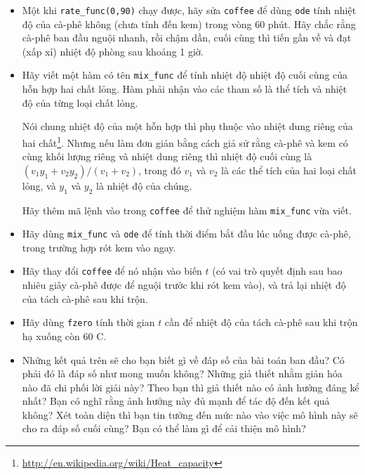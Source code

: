 \documentclass[12pt]{book}
\begin{document}
\begin{ex}
\begin{itemize}
\item Một khi \verb#rate_func(0,90)# chạy được, hãy sửa
{\tt coffee} để dùng {\tt ode} tính nhiệt độ của cà-phê không (chưa tính
đến kem) trong vòng 60 phút. Hãy chắc rằng cà-phê ban đầu
nguội nhanh, rồi chậm dần, cuối cùng thì tiến gần về và đạt (xấp xỉ)
nhiệt độ phòng sau khoảng 1 giờ.

\item Hãy viết một hàm có tên \verb#mix_func# để tính nhiệt độ 
nhiệt độ cuối cùng của hỗn hợp hai chất lỏng. Hàm phải nhận vào
các tham số là thể tích và nhiệt độ của từng loại chất lỏng.

Nói chung nhiệt độ của một hỗn hợp thì phụ thuộc vào nhiệt dung
riêng của hai chất\footnote{\url{http://en.wikipedia.org/wiki/Heat_capacity}}.
Nhưng nếu làm đơn giản bằng cách giả sử rằng cà-phê và kem có
cùng khối lượng riêng và nhiệt dung riêng thì nhiệt độ cuối cùng là
$(v_1 y_1 + v_2 y_2) / (v_1 + v_2)$, trong đó $v_1$ và $v_2$ là
các thể tích của hai loại chất lỏng, và $y_1$ và $y_2$ là nhiệt độ của chúng.

Hãy thêm mã lệnh vào trong {\tt coffee} để thử nghiệm hàm 
\verb#mix_func# vừa viết.

\item Hãy dùng \verb#mix_func# và {\tt ode} để tính thời điểm
bắt đầu lúc uống được cà-phê, trong trường hợp rót kem vào ngay.

\item Hãy thay đổi {\tt coffee} để nó nhận vào biến $t$ (có vai trò
quyết định sau bao nhiêu giây cà-phê được để nguội trước khi rót kem
vào), và trả lại nhiệt độ của tách cà-phê sau khi trộn.

\item Hãy dùng {\tt fzero} tính thời gian $t$ cần để nhiệt độ của
tách cà-phê sau khi trộn hạ xuống còn 60 \degree C.

\item Những kết quả trên sẽ cho bạn biết gì về đáp số của bài toán
ban đầu? Có phải đó là đáp số như mong muốn không? Những
giả thiết nhằm giản hóa nào đã chi phối lời giải này? Theo bạn thì
giả thiết nào có ảnh hưởng đáng kể nhất? Bạn có nghĩ rằng ảnh
hưởng này đủ mạnh để tác độ đến kết quả không? Xét toàn diện
thì bạn tin tưởng đến mức nào vào việc mô hình này sẽ cho ra 
đáp số cuối cùng? Bạn có thể làm gì để cải thiện mô hình?

\end{itemize}

\end{ex}
\end{document}
